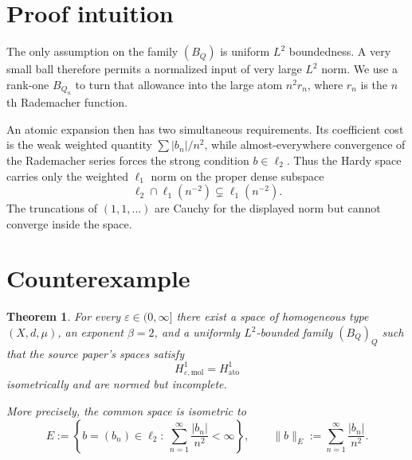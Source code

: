 \documentclass[11pt]{article}
\newtheorem{theorem}{Theorem}
\newcommand{\1}{\mathbf 1}
\newcommand{\eps}{\varepsilon}
\begin{document}
\section{Proof intuition}

The only assumption on the family $(B_Q)$ is uniform $L^2$ boundedness. A very small ball therefore permits a normalized input of very large $L^2$ norm. We use a rank-one $B_{Q_n}$ to turn that allowance into the large atom $n^2r_n$, where $r_n$ is the $n$th Rademacher function.

An atomic expansion then has two simultaneous requirements. Its coefficient cost is the weak weighted quantity $\sum |b_n|/n^2$, while almost-everywhere convergence of the Rademacher series forces the strong condition $b\in\ell_2$. Thus the Hardy space carries only the weighted $\ell_1$ norm on the proper dense subspace
\[
  \ell_2\cap\ell_1(n^{-2})\subsetneq\ell_1(n^{-2}).
\]
The truncations of $(1,1,\ldots)$ are Cauchy for the displayed norm but cannot converge inside the space.

\section{Counterexample}

\begin{theorem}\label{thm:main}
For every $\eps\in(0,\infty]$ there exist a space of homogeneous type $(X,d,\mu)$, an exponent $\beta=2$, and a uniformly $L^2$-bounded family $(B_Q)_Q$ such that the source paper's spaces satisfy
\[
  H^1_{\eps,\mathrm{mol}}=H^1_{\mathrm{ato}}
\]
isometrically and are normed but incomplete.

More precisely, the common space is isometric to
\[
  E:=\left\{b=(b_n)\in\ell_2:\ \sum_{n=1}^\infty\frac{|b_n|}{n^2}<\infty\right\},
  \qquad
  \|b\|_E:=\sum_{n=1}^\infty\frac{|b_n|}{n^2}.
\]
\end{theorem}
\end{document}
